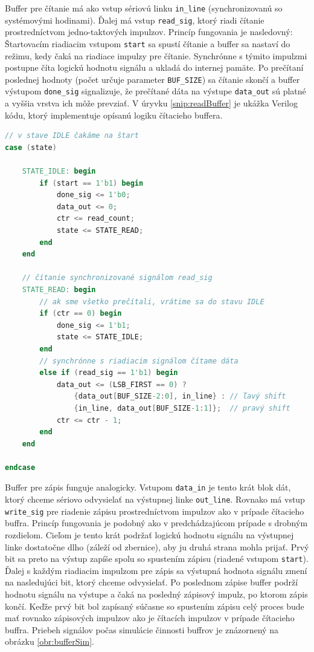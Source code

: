 Buffer pre čítanie má ako vstup sériovú linku \texttt{in\_line} (synchronizovanú so systémovými hodinami). Ďalej má vstup \texttt{read\_sig}, ktorý riadi čítanie prostredníctvom jedno-taktových impulzov. Princíp fungovania je nasledovný: Štartovacím riadiacim vstupom \texttt{start} sa spustí čítanie a buffer sa nastaví do režimu, kedy čaká na riadiace impulzy pre čítanie. Synchrónne s týmito impulzmi postupne číta logickú hodnotu signálu a ukladá do internej pamäte. Po prečítaní poslednej hodnoty (počet určuje parameter \texttt{BUF\_SIZE}) sa čítanie skončí a buffer výstupom \texttt{done\_sig} signalizuje, že prečítané dáta na výstupe \texttt{data\_out} sú platné a vyššia vrstva ich môže prevziať. V úryvku \ref{snip:readBuffer} je ukážka Verilog kódu, ktorý implementuje opísanú logiku čítacieho buffera.

\begin{lstlisting}[float,language=Verilog,caption={Verilog kód pre čítací buffer.},label=snip:readBuffer]
// v stave IDLE čakáme na štart
case (state)

    STATE_IDLE: begin
        if (start == 1'b1) begin
            done_sig <= 1'b0;
            data_out <= 0;
            ctr <= read_count;
            state <= STATE_READ;
        end
    end
    
    // čítanie synchronizované signálom read_sig
    STATE_READ: begin
        // ak sme všetko prečítali, vrátime sa do stavu IDLE
        if (ctr == 0) begin
            done_sig <= 1'b1;
            state <= STATE_IDLE;
        end
        // synchrónne s riadiacim signálom čítame dáta
        else if (read_sig == 1'b1) begin
            data_out <= (LSB_FIRST == 0) ?
                {data_out[BUF_SIZE-2:0], in_line} : // ľavý shift
                {in_line, data_out[BUF_SIZE-1:1]};  // pravý shift
            ctr <= ctr - 1;
        end
    end

endcase
\end{lstlisting}

Buffer pre zápis funguje analogicky. Vstupom \texttt{data\_in} je tento krát blok dát, ktorý chceme sériovo odvysielať na výstupnej linke \texttt{out\_line}. Rovnako má vstup \texttt{write\_sig} pre riadenie zápisu prostredníctvom impulzov ako v prípade čítacieho buffra. Princíp fungovania je podobný ako v predchádzajúcom prípade s drobným rozdielom. Cieľom je tento krát podržať logickú hodnotu signálu na výstupnej linke dostatočne dlho (záleží od zbernice), aby ju druhá strana mohla prijať. Prvý bit sa preto na výstup zapíše spolu so spustením zápisu (riadené vstupom \texttt{start}). Ďalej s každým riadiacim impulzom pre zápis sa výstupná hodnota signálu zmení na nasledujúci bit, ktorý chceme odvysielať. Po poslednom zápise buffer podrží hodnotu signálu na výstupe a čaká na posledný zápisový impulz, po ktorom zápis končí. Keďže prvý bit bol zapísaný súčasne so spustením zápisu celý proces bude mať rovnako zápisových impulzov ako je čítacích impulzov v prípade čítacieho buffra. Priebeh signálov počas simulácie činnosti buffrov je znázornený na obrázku \ref{obr:bufferSim}.

